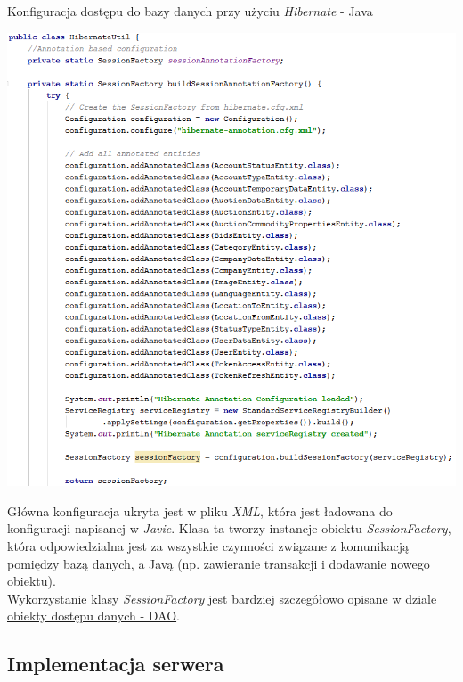 \documentclass[10pt,titlepage]{article} %
\begin{document}
\begin{listing}[H]
\caption[Konfiguracja dostępu do bazy danych przy użyciu \textit{Hibernate} - Java]{Konfiguracja dostępu do bazy danych przy użyciu \textit{Hibernate} - Java}
\includegraphics[width=1.0\textwidth, height=1.0\textheight, keepaspectratio ]{img/sekcja3/bd/hibernateKonfiguracjaJava}
\end{listing}
Główna konfiguracja ukryta jest w pliku \textit{XML}, która jest ładowana do konfiguracji napisanej w \textit{Javie}. Klasa ta tworzy instancje obiektu \textit{SessionFactory}, która odpowiedzialna jest za wszystkie czynności związane z komunikacją pomiędzy bazą danych, a Javą (np. zawieranie transakcji i dodawanie nowego obiektu).\mbox{}\\
Wykorzystanie klasy \textit{SessionFactory} jest bardziej szczegółowo opisane w dziale \hyperref[Obiekty dostępu danych - DAO]{obiekty dostępu danych - DAO}.
\subsection{Implementacja serwera}
\end{document}
